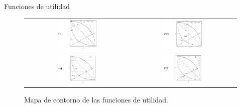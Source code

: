 \documentclass{beamer}
\begin{document}
\begin{frame}{Funciones de utilidad}
\begin{figure}[H]
\begin{tabular}{c c}
\includegraphics[width=0.4\textwidth]{ws.png}     &  \includegraphics[width=0.4\textwidth]{che.png} \\
\includegraphics[width=0.4\textwidth]{asf.png}     &  \includegraphics[width=0.4\textwidth]{pbi.png} \\
\end{tabular}
\centering
\caption{\scriptsize Mapa de contorno de las funciones de utilidad.}
\end{figure}
\end{frame}
\end{document}
